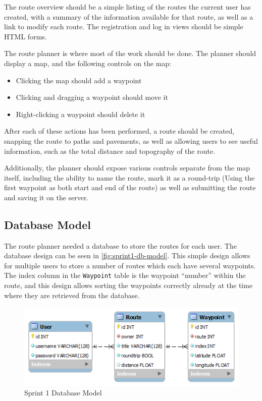 The route overview should be a simple listing of the routes the current user has created, with a summary of the information available for that route, as well as a link to modify each route. The registration and log in views should be simple \ac{HTML} forms.

The route planner is where most of the work should be done. The planner should display a map, and the following controls on the map:

\begin{itemize}
 \item Clicking the map should add a waypoint
 \item Clicking and dragging a waypoint should move it
 \item Right-clicking a waypoint should delete it
\end{itemize}

After each of these actions has been performed, a route should be created, snapping the route to paths and pavements, as well as allowing users to see useful information, such as the total distance and topography of the route.

Additionally, the planner should expose various controls separate from the map itself, including the ability to name the route, mark it as a round-trip (Using the first waypoint as both start and end of the route) as well as submitting the route and saving it on the server.

\subsection{Database Model}

The route planner needed a database to store the routes for each user. The database design can be seen in \autoref{fig:sprint1-db-model}. This simple design allows for multiple users to store a number of routes which each have several waypoints. The index column in the \texttt{Waypoint} table is the waypoint ``number'' within the route, and this design allows sorting the waypoints correctly already at the time where they are retrieved from the database.

\begin{figure}[ht]
 \caption{Sprint 1 Database Model}
 \label{fig:sprint1-db-model}
 \includegraphics[scale=0.5]{img/sprint1db.png}
\end{figure}

